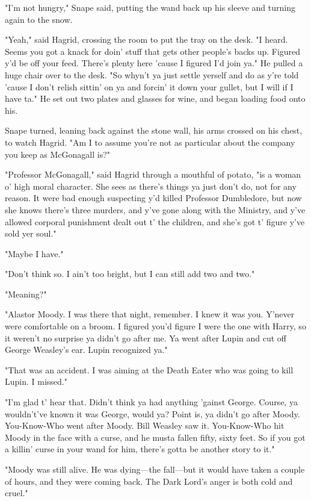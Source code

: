"I'm not hungry," Snape said, putting the wand back up his sleeve and turning again to the snow.

"Yeah," said Hagrid, crossing the room to put the tray on the desk. "I heard. Seems you got a knack for doin' stuff that gets other people's backs up. Figured y'd be off your feed. There's plenty here 'cause I figured I'd join ya." He pulled a huge chair over to the desk. "So whyn't ya just settle yerself and do as y're told 'cause I don't relish sittin' on ya and forcin' it down your gullet, but I will if I have ta." He set out two plates and glasses for wine, and began loading food onto his.

Snape turned, leaning back against the stone wall, his arms crossed on his chest, to watch Hagrid. "Am I to assume you're not as particular about the company you keep as McGonagall is?"

"Professor McGonagall," said Hagrid through a mouthful of potato, "is a woman o' high moral character. She sees as there's things ya just don't do, not for any reason. It were bad enough suspecting y'd killed Professor Dumbledore, but now she knows there's three murders, and y've gone along with the Ministry, and y've allowed corporal punishment dealt out t' the children, and she's got t' figure y've sold yer soul."

"Maybe I have."

"Don't think so. I ain't too bright, but I can still add two and two."

"Meaning?"

"Alastor Moody. I was there that night, remember. I knew it was you. Y'never were comfortable on a broom. I figured you'd figure I were the one with Harry, so it weren't no surprise ya didn't go after me. Ya went after Lupin and cut off George Weasley's ear. Lupin recognized ya."

"That was an accident. I was aiming at the Death Eater who was going to kill Lupin. I{\el} missed."

"I'm glad t' hear that. Didn't think ya had anything 'gainst George. Course, ya wouldn't've known it was George, would ya? Point is, ya didn't go after Moody. You-Know-Who went after Moody. Bill Weasley saw it. You-Know-Who hit Moody in the face with a curse, and he musta fallen fifty, sixty feet. So if you got a killin' curse in your wand for him, there's gotta be another story to it."

"Moody was still alive. He was dying—the fall—but it would have taken a couple of hours, and they were coming back. The Dark Lord's anger is both cold and cruel."

